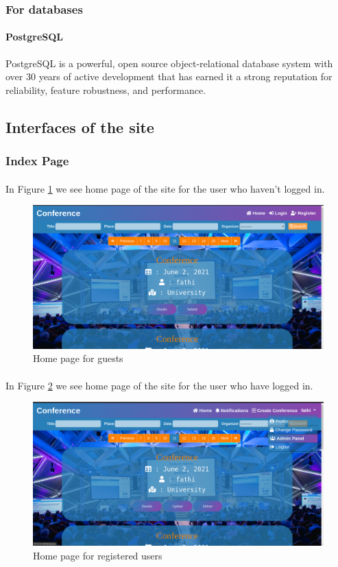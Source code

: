 \documentclass[12pt,a4paper]{article}
\begin{document}
	\subsubsection{For databases}
	\paragraph{PostgreSQL}
	PostgreSQL is a powerful, open source object-relational database system with over 30 years of active development that has earned it a strong reputation for reliability, feature robustness, and performance.\cite{PostgreSQL}
	\subsection{Interfaces of the site}
	\subsubsection{Index Page}
	\paragraph{}
	In Figure \ref{fig:home-before-login} we see home page of the site for the user who haven't logged in.
	\begin{figure}[b]
		\centering
		\includegraphics[width=\textwidth]{interfaces/before_login.png}
		\caption{Home page for guests}
		\label{fig:home-before-login}
	\end{figure}
	\paragraph{}
	In Figure \ref{fig:home-after-login} we see home page of the site for the user who have logged in.
	\begin{figure}[b]
		\centering
		\includegraphics[width=\textwidth]{interfaces/after_login.png}
		\caption{Home page for registered users}
		\label{fig:home-after-login}
	\end{figure}
\end{document}
